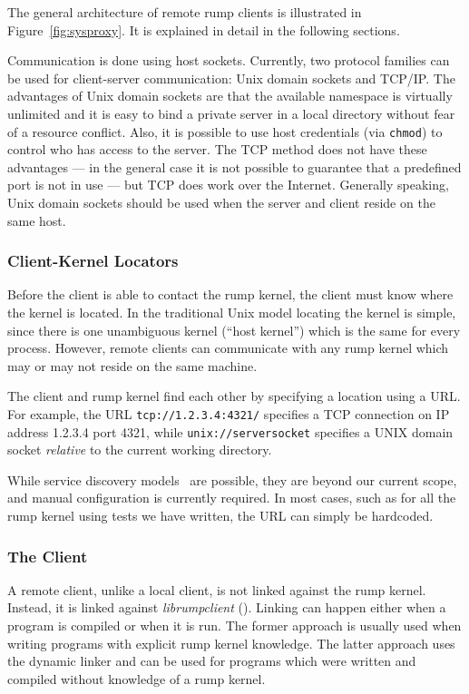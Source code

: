 The general architecture of remote rump clients is illustrated in
Figure~\ref{fig:sysproxy}.  It is explained in detail in the
following sections.

Communication is done using host sockets.  Currently, two protocol
families can be used for client-server communication: Unix domain
sockets and TCP/IP.  The advantages of Unix domain sockets are that
the available namespace is virtually unlimited and it is easy to
bind a private server in a local directory without fear of a resource
conflict.  Also, it is possible to use host credentials (via
\texttt{chmod}) to control who has access to the server.  The TCP
method does not have these advantages --- in the general case it
is not possible to guarantee that a predefined port is not in use
--- but TCP does work over the Internet.  Generally speaking, Unix
domain sockets should be used when the server and client reside on
the same host.

\subsubsection{Client-Kernel Locators}

Before the client is able to contact the rump kernel, the client
must know where the kernel is located.  In the traditional Unix
model locating the kernel is simple, since there is one unambiguous kernel (``host
kernel'') which is the same for every process.  However, remote
clients can communicate with any rump kernel which may or may not
reside on the same machine.

The client and rump kernel find each other by specifying a location
using a URL.  For example, the URL \verb+tcp://1.2.3.4:4321/+
specifies a TCP connection on IP address 1.2.3.4 port 4321, while
\verb+unix://serversocket+ specifies a UNIX domain socket
\textit{relative} to the current working directory.

While service discovery models~\cite{czerwinski:sds} are possible,
they are beyond our current scope, and manual
configuration is currently required.  In most cases, such as for
all the rump kernel using tests we have written, the URL can simply
be hardcoded.

\subsubsection{The Client}

A remote client, unlike a local client, is not linked against the rump kernel.  Instead,
it is linked against \textit{librumpclient}
().  Linking can happen
either when a program is compiled or when it is run.  The former
approach is usually used when writing programs with explicit rump
kernel knowledge.  The latter approach uses the dynamic linker and
can be used for programs which were written and compiled without knowledge of
a rump kernel.

